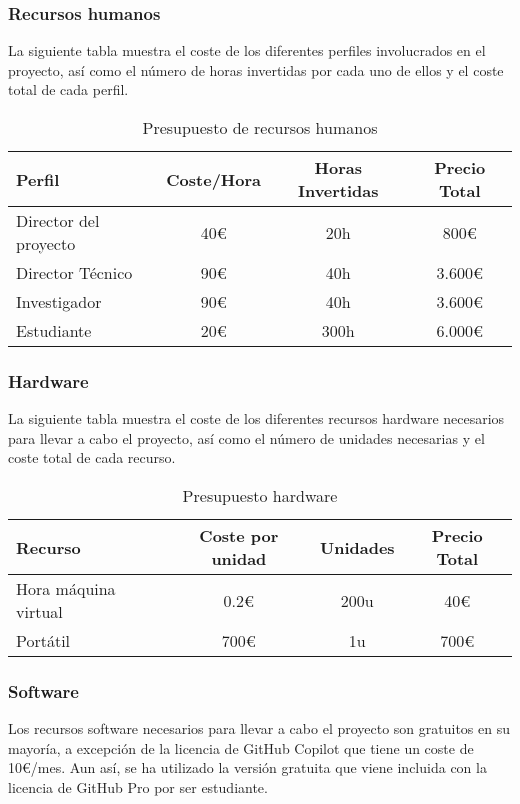 \subsubsection{Recursos humanos}
La siguiente tabla muestra el coste de los diferentes perfiles involucrados en el proyecto,
así como el número de horas invertidas por cada uno de ellos y el coste total de cada perfil.

\begin{table}[ht]
    \centering
    \begin{tabular}[ht]{l|c|c|c} 
        \textbf{Perfil} & \textbf{Coste/Hora} & \textbf{Horas Invertidas} & \textbf{Precio Total}\\
        \hline
        Director del proyecto   & 40\euro   & 20h    & 800\euro   \\
        Director Técnico        & 90\euro   & 40h    & 3.600\euro  \\
        Investigador            & 90\euro   & 40h    & 3.600\euro  \\
        Estudiante              & 20\euro   & 300h   & 6.000\euro   \\
    \end{tabular}
    \caption{Presupuesto de recursos humanos}
    \label{tab:huma-resources}
\end{table}

\subsubsection{Hardware}
La siguiente tabla muestra el coste de los diferentes recursos hardware necesarios para
llevar a cabo el proyecto, así como el número de unidades necesarias y el coste total de
cada recurso. 

\begin{table}[ht]
    \centering
    \begin{tabular}[ht]{l|c|c|c} 
        \textbf{Recurso} & \textbf{Coste por unidad} & \textbf{Unidades} & \textbf{Precio Total}\\
        \hline
        Hora máquina virtual       & 0.2\euro      & 200u   & 40\euro    \\
        Portátil                    & 700\euro      & 1u    & 700\euro   \\
    \end{tabular}
    \caption{Presupuesto hardware}
    \label{tab:hardware-budget}
\end{table}

\subsubsection{Software}
Los recursos software necesarios para llevar a cabo el proyecto son gratuitos en su mayoría, 
a excepción de la licencia de GitHub Copilot que tiene un coste de 10\euro/mes. Aun así, se ha
utilizado la versión gratuita que viene incluida con la licencia de GitHub Pro por ser estudiante. 


